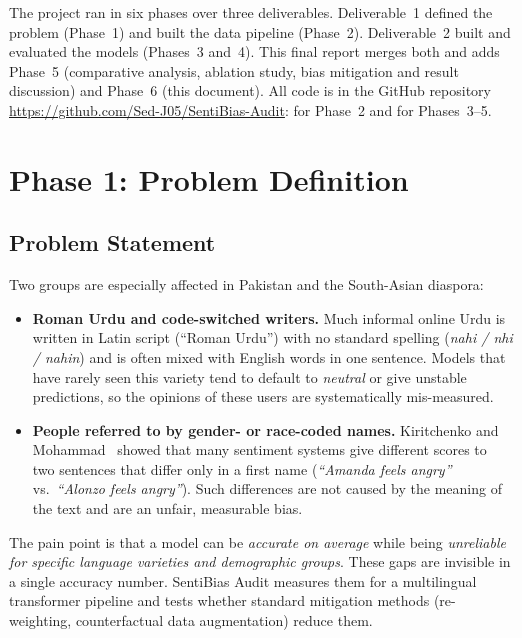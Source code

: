 \documentclass[11pt,a4paper]{article}
\begin{document}
The project ran in six phases over three deliverables. Deliverable~1 defined the problem
(Phase~1) and built the data pipeline (Phase~2). Deliverable~2 built and evaluated the models
(Phases~3 and~4). This final report merges both and adds Phase~5 (comparative analysis,
ablation study, bias mitigation and result discussion) and Phase~6 (this document). All code
is in the GitHub repository \url{https://github.com/Sed-J05/SentiBias-Audit}:
 for Phase~2 and  for Phases~3--5.

\section{Phase 1: Problem Definition}

\subsection{Problem Statement}
Two groups are especially affected in Pakistan and the South-Asian diaspora:
\begin{itemize}
  \item \textbf{Roman Urdu and code-switched writers.} Much informal online Urdu is written in
        Latin script (``Roman Urdu'') with no standard spelling (\emph{nahi / nhi / nahin})
        and is often mixed with English words in one sentence. Models that have rarely seen
        this variety tend to default to \emph{neutral} or give unstable predictions, so the
        opinions of these users are systematically mis-measured.
  \item \textbf{People referred to by gender- or race-coded names.} Kiritchenko and
        Mohammad~\cite{eec} showed that many sentiment systems give different scores to two
        sentences that differ only in a first name (\emph{``Amanda feels angry''} vs.\
        \emph{``Alonzo feels angry''}). Such differences are not caused by the meaning of the
        text and are an unfair, measurable bias.
\end{itemize}
The pain point is that a model can be \emph{accurate on average} while being
\emph{unreliable for specific language varieties and demographic groups}. These gaps are
invisible in a single accuracy number. SentiBias Audit measures them for a multilingual
transformer pipeline and tests whether standard mitigation methods (re-weighting,
counterfactual data augmentation) reduce them.
\end{document}
